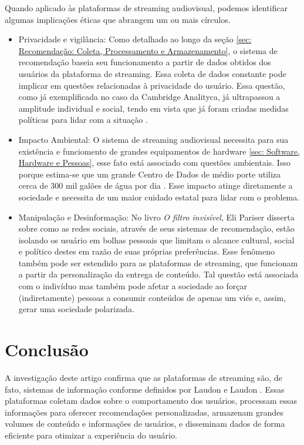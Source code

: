 \documentclass[conference]{IEEEtran}
\begin{document}
Quando aplicado às plataformas de streaming audiovisual, podemos identificar algumas implicações éticas que abrangem um ou mais círculos.

\begin{itemize}
    \item Privacidade e vigilância: Como detalhado ao longo da seção \ref{sec: Recomendação: Coleta, Processamento e Armazenamento}, o sistema de recomendação baseia seu funcionamento a partir de dados obtidos dos usuários da plataforma de streaming. Essa coleta de dados constante pode implicar em questões relacionadas à privacidade do usuário. Essa questão, como já exemplificada no caso da Cambridge Analityca, já ultrapassou a amplitude individual e social, tendo em vista que já foram criadas medidas políticas para lidar com a situação \cite{b12}.
    \item Impacto Ambiental: O sistema de streaming audiovisual necessita para sua existência e funciomento de grandes equipamentos de hardware \ref{sec: Software, Hardware e Pessoas}, esse fato está associado com questões ambientais. Isso porque estima-se que um grande Centro de Dados de médio porte utiliza cerca de 300 mil galões de água por dia \cite{b13}. Esse impacto atinge diretamente a sociedade e necessita de um maior cuidado estatal para lidar com o problema.
    \item Manipulação e Desinformação: No livro \textit{O filtro invisível}, Eli Pariser \cite{b14} disserta sobre como as redes sociais, através de seus sistemas de recomendação, estão isolando os usuário em bolhas pessoais que limitam o alcance cultural, social e político destes em razão de suas próprias preferências. Esse fenômeno também pode ser estendido para as plataformas de streaming, que funcionam a partir da personalização da entrega de conteúdo. Tal questão está associada com o indivíduo mas também pode afetar a sociedade ao forçar (indiretamente) pessoas a consumir conteúdos de apenas um viés e, assim, gerar uma sociedade polarizada.
    
\end{itemize}


\section{Conclusão}
A investigação deste artigo confirma que as plataformas de streaming são, de fato, sistemas de informação conforme definidos por Laudon e Laudon \cite{b3}. Essas plataformas coletam dados sobre o comportamento dos usuários, processam essas informações para oferecer recomendações personalizadas, armazenam grandes volumes de conteúdo e informações de usuários, e disseminam dados de forma eficiente para otimizar a experiência do usuário.
\end{document}
